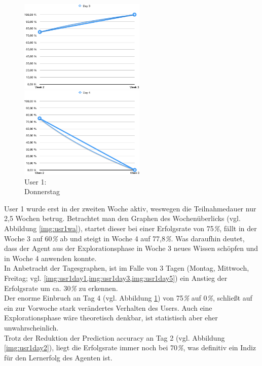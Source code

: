 \begin{figure}[t!]
    \centering
    \parbox{6cm}{
    \includegraphics[width=6cm]{./Abbildungen/Kapitel_04/usr1day3.png}
    \caption{User 1: \\Mittwoch}
    \label{img:usr1day3}}
    \qquad
    \begin{minipage}{6cm}
    \includegraphics[width=6cm]{./Abbildungen/Kapitel_04/usr1day4.png}
    \caption{User 1: \\Donnerstag}
    \label{img:usr1day4}
    \end{minipage}
\end{figure}

User 1 wurde erst in der zweiten Woche aktiv, weswegen die Teilnahmedauer nur 2,5 Wochen betrug. 
Betrachtet man den Graphen des Wochenüberlicks (vgl. Abbildung \ref{img:usr1wa}), startet dieser bei einer Erfolgsrate von 75\textit{\%}, fällt in der Woche 3 auf 60\textit{\%} ab und steigt in Woche 4 auf 77,8\textit{\%}. Was daraufhin deutet, dass der Agent aus der Explorationsphase in Woche 3 neues Wissen schöpfen und in Woche 4 anwenden konnte.\\
In Anbetracht der Tagesgraphen, ist im Falle von 3 Tagen (Montag, Mittwoch, Freitag; vgl. \cref{img:usr1day1,img:usr1day3,img:usr1day5}) ein Anstieg der Erfolgsrate um ca. 30\textit{\%} zu erkennen. \\
Der enorme Einbruch an Tag 4 (vgl. Abbildung \ref{img:usr1day4}) von 75\textit{\%} auf 0\textit{\%}, schließt auf ein zur Vorwoche stark verändertes Verhalten des Users. Auch eine Explorationsphase wäre theoretisch denkbar, ist statistisch aber eher unwahrscheinlich.\\
Trotz der Reduktion der Prediction accuracy an Tag 2 (vgl. Abbildung \ref{img:usr1day2}), liegt die Erfolgsrate immer noch bei 70\textit{\%}, was definitiv ein Indiz für den Lernerfolg des Agenten ist. 



